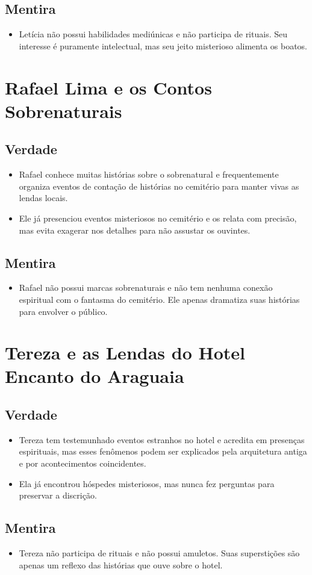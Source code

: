 \subsection*{Mentira}
\begin{itemize}
    \item Letícia não possui habilidades mediúnicas e não participa de rituais. Seu interesse é puramente intelectual, mas seu jeito misterioso alimenta os boatos.
\end{itemize}

\section{Rafael Lima e os Contos Sobrenaturais}

\subsection*{Verdade}
\begin{itemize}
    \item Rafael conhece muitas histórias sobre o sobrenatural e frequentemente organiza eventos de contação de histórias no cemitério para manter vivas as lendas locais.
    \item Ele já presenciou eventos misteriosos no cemitério e os relata com precisão, mas evita exagerar nos detalhes para não assustar os ouvintes.
\end{itemize}

\subsection*{Mentira}
\begin{itemize}
    \item Rafael não possui marcas sobrenaturais e não tem nenhuma conexão espiritual com o fantasma do cemitério. Ele apenas dramatiza suas histórias para envolver o público.
\end{itemize}

\section{Tereza e as Lendas do Hotel Encanto do Araguaia}

\subsection*{Verdade}
\begin{itemize}
    \item Tereza tem testemunhado eventos estranhos no hotel e acredita em presenças espirituais, mas esses fenômenos podem ser explicados pela arquitetura antiga e por acontecimentos coincidentes.
    \item Ela já encontrou hóspedes misteriosos, mas nunca fez perguntas para preservar a discrição.
\end{itemize}

\subsection*{Mentira}
\begin{itemize}
    \item Tereza não participa de rituais e não possui amuletos. Suas superstições são apenas um reflexo das histórias que ouve sobre o hotel.
\end{itemize}

